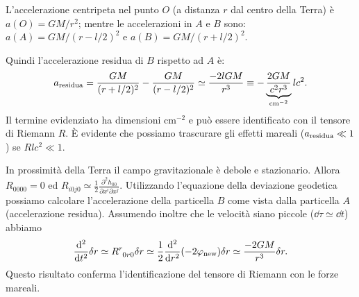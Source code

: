 L'accelerazione centripeta nel punto $O$ (a distanza $r$ dal centro della Terra)
è $a(O) = GM/r^2$; mentre le accelerazioni in $A$ e $B$ sono: $a(A) =
GM/(r-l/2)^2$ e $a(B) = GM/(r+l/2)^2$.

Quindi l'accelerazione residua di $B$ rispetto ad $A$ è:
\begin{equation}
  a_{\textup{residua}} = \frac{GM}{(r+l/2)^2} - \frac{GM}{(r-l/2)^2} \simeq
  \frac{-2lGM}{r^3} \equiv - \underbrace{\frac{2GM}{c^2 r^3}}_{\textup{cm}^{-2}}
  lc^2.
\end{equation}
Il termine evidenziato ha dimensioni cm$^{-2}$ e può essere identificato con il
tensore di Riemann $R$.  È evidente che possiamo trascurare gli effetti mareali
($a_{\textup{residua}} \ll 1 $) se $ R l c^2 \ll 1 $.

In prossimità della Terra il campo gravitazionale è debole e stazionario.
Allora $R_{0000}=0$ ed $R_{i0j0} \simeq \frac{1}{2} \frac{\partial ^2
  h_{00}}{\partial x^i \partial x^j}$.  Utilizzando l'equazione della deviazione
geodetica possiamo calcolare l'accelerazione della particella $B$ come vista
dalla particella $A$ (accelerazione residua).  Assumendo inoltre che le velocità
siano piccole ($\dd\tau \simeq \dd t$) abbiamo
\begin{equation}
  \toder[2]{}{t} \delta r \simeq \tensor{R}{^r_{0r0}} \delta r \simeq
  \frac{1}{2} \toder[2]{}{r} (-2 \phi_{\textup{new}}) \delta r \simeq
  \frac{-2GM}{r^3} \delta r.
\end{equation}
Questo risultato conferma l'identificazione del tensore di Riemann con le forze
mareali.

